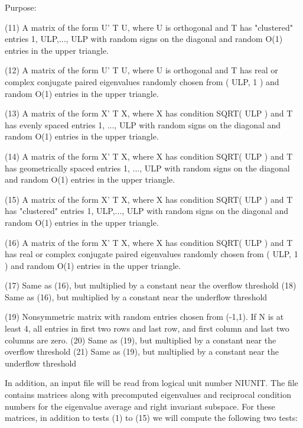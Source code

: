 \begin{DoxyParagraph}{Purpose\+: }
\begin{DoxyVerb}
    (11) A matrix of the form  U' T U, where U is orthogonal and
         T has "clustered" entries 1, ULP,..., ULP with random
         signs on the diagonal and random O(1) entries in the upper
         triangle.

    (12) A matrix of the form  U' T U, where U is orthogonal and
         T has real or complex conjugate paired eigenvalues randomly
         chosen from ( ULP, 1 ) and random O(1) entries in the upper
         triangle.

    (13) A matrix of the form  X' T X, where X has condition
         SQRT( ULP ) and T has evenly spaced entries 1, ..., ULP
         with random signs on the diagonal and random O(1) entries
         in the upper triangle.

    (14) A matrix of the form  X' T X, where X has condition
         SQRT( ULP ) and T has geometrically spaced entries
         1, ..., ULP with random signs on the diagonal and random
         O(1) entries in the upper triangle.

    (15) A matrix of the form  X' T X, where X has condition
         SQRT( ULP ) and T has "clustered" entries 1, ULP,..., ULP
         with random signs on the diagonal and random O(1) entries
         in the upper triangle.

    (16) A matrix of the form  X' T X, where X has condition
         SQRT( ULP ) and T has real or complex conjugate paired
         eigenvalues randomly chosen from ( ULP, 1 ) and random
         O(1) entries in the upper triangle.

    (17) Same as (16), but multiplied by a constant
         near the overflow threshold
    (18) Same as (16), but multiplied by a constant
         near the underflow threshold

    (19) Nonsymmetric matrix with random entries chosen from (-1,1).
         If N is at least 4, all entries in first two rows and last
         row, and first column and last two columns are zero.
    (20) Same as (19), but multiplied by a constant
         near the overflow threshold
    (21) Same as (19), but multiplied by a constant
         near the underflow threshold

    In addition, an input file will be read from logical unit number
    NIUNIT. The file contains matrices along with precomputed
    eigenvalues and reciprocal condition numbers for the eigenvalue
    average and right invariant subspace. For these matrices, in
    addition to tests (1) to (15) we will compute the following two
    tests:


\end{DoxyVerb}
\end{DoxyParagraph}
